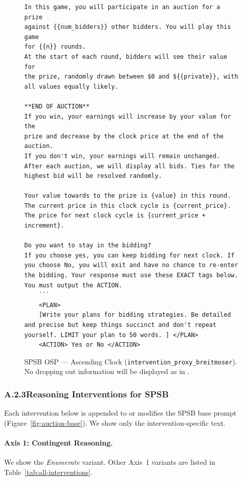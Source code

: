 \begin{figure}[H]
\begin{lstlisting}
In this game, you will participate in an auction for a prize
against {{num_bidders}} other bidders. You will play this game
for {{n}} rounds.
At the start of each round, bidders will see their value for
the prize, randomly drawn between $0 and ${{private}}, with
all values equally likely.

**END OF AUCTION**
If you win, your earnings will increase by your value for the
prize and decrease by the clock price at the end of the auction.
If you don't win, your earnings will remain unchanged.
After each auction, we will display all bids. Ties for the
highest bid will be resolved randomly.

Your value towards to the prize is {value} in this round.
The current price in this clock cycle is {current_price}. 
The price for next clock cycle is {current_price + increment}.

Do you want to stay in the bidding? 
If you choose yes, you can keep bidding for next clock. If you choose No, you will exit and have no chance to re-enter the bidding. Your response must use these EXACT tags below. You must output the ACTION.
    ```
    <PLAN>
    [Write your plans for bidding strategies. Be detailed and precise but keep things succinct and don't repeat yourself. LIMIT your plan to 50 words. ] </PLAN>
    <ACTION> Yes or No </ACTION>
\end{lstlisting}
\caption{SPSB OSP --- Ascending Clock (\texttt{intervention\_proxy\_breitmoser}). No dropping out information will be displayed as in \citet{breitmoser2022obviousness}.}
\label{fig:auction-proxy}
\end{figure}


\subsubsection*{A.2.3\quad Reasoning Interventions for SPSB}

Each intervention below is appended to or modifies the SPSB base prompt (Figure~\ref{fig:auction-base}). We show only the intervention-specific text.

\paragraph{Axis 1: Contingent Reasoning.}
We show the \emph{Enumerate} variant. Other Axis~1 variants are listed in Table~\ref{tab:all-interventions}.

